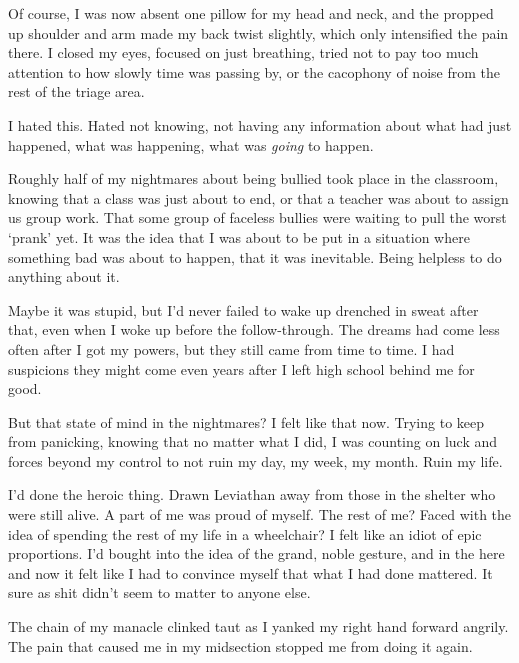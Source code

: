 Of course, I was now absent one pillow for my head and neck, and the propped up shoulder and arm made my back twist slightly, which only intensified the pain there.  I closed my eyes, focused on just breathing, tried not to pay too much attention to how slowly time was passing by, or the cacophony of noise from the rest of the triage area.



I hated this.  Hated not knowing, not having any information about what had just happened, what was happening, what was \emph{going} to happen.



Roughly half of my nightmares about being bullied took place in the classroom, knowing that a class was just about to end, or that a teacher was about to assign us group work.  That some group of faceless bullies were waiting to pull the worst `prank' yet.  It was the idea that I was about to be put in a situation where something bad was about to happen, that it was inevitable.  Being helpless to do anything about it.



Maybe it was stupid, but I'd never failed to wake up drenched in sweat after that, even when I woke up before the follow-through.  The dreams had come less often after I got my powers, but they still came from time to time.  I had suspicions they might come even years after I left high school behind me for good.



But that state of mind in the nightmares?  I felt like that now.  Trying to keep from panicking, knowing that no matter what I did, I was counting on luck and forces beyond my control to not ruin my day, my week, my month.  Ruin my life.



I'd done the heroic thing.  Drawn Leviathan away from those in the shelter who were still alive.  A part of me was proud of myself.  The rest of me?  Faced with the idea of spending the rest of my life in a wheelchair?  I felt like an idiot of epic proportions.  I'd bought into the idea of the grand, noble gesture, and in the here and now it felt like I had to convince myself that what I had done mattered.  It sure as shit didn't seem to matter to anyone else.



The chain of my manacle clinked taut as I yanked my right hand forward angrily.  The pain that caused me in my midsection stopped me from doing it again.



